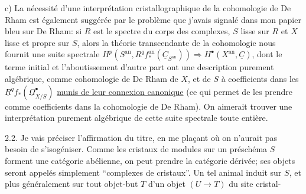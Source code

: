 c) La nécessité d'une interprétation cristallographique de la cohomologie de De Rham est également suggérée par le problème que j'avais signalé dans mon papier bleu sur De Rham: si $R$ est le spectre du corps des complexes, $S$ lisse sur $R$ et $X$ lisse et propre sur $S$, alors la théorie transcendante de la cohomologie nous fournit une suite spectrale $H^p(S^{\mathrm{an}},R^qf^{\mathrm{an}}_*(\underline{C}_{S^{\mathrm{an}}}))\Longrightarrow H^{\bullet}(X^{\mathrm{an}},\underline{C})$, dont le terme initial et l'aboutissement d'autre part ont une description purement algébrique, comme cohomologie de De Rham de $X$, et de $S$ à coefficients dans les $\underline{R}^qf_*(\underline{\Omega}^{\bullet}_{X/S})$ \uline{munis de leur connexion canonique}  (ce qui permet de les prendre comme coefficients dans la cohomologie de De Rham). On aimerait trouver une interprétation purement algébrique de cette suite spectrale toute entière.

2.2. Je vais préciser  l'affirmation du titre, en me plaçant  où on n'aurait pas besoin de s'isogéniser.
Comme les cristaux de modules sur un préschéma $S$ forment une catégorie abélienne, on peut prendre la catégorie dérivée; ses objets seront appelés simplement ``complexes de cristaux''. Un tel animal induit sur $S$, et plus généralement sur tout objet-but $T$ d'un objet $(U\longrightarrow T)$ du site cristal-


